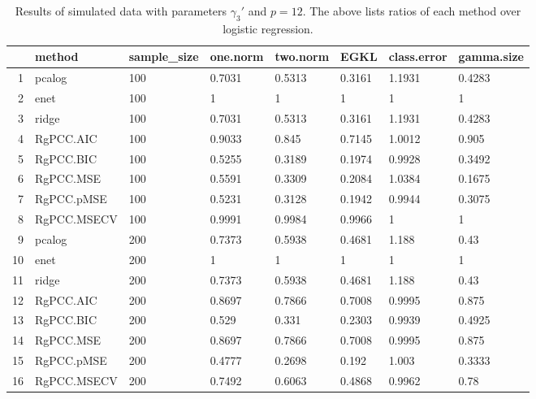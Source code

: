 \begin{table}[ht]
\centering
\begin{tabular}{rlllllll}
  \hline
 & method & sample\_size & one.norm & two.norm & EGKL & class.error & gamma.size \\ 
  \hline
1 & pcalog & 100 & 0.7031 & 0.5313 & 0.3161 & 1.1931 & 0.4283 \\ 
  2 & enet & 100 & 1 & 1 & 1 & 1 & 1 \\ 
  3 & ridge & 100 & 0.7031 & 0.5313 & 0.3161 & 1.1931 & 0.4283 \\ 
  4 & RgPCC.AIC & 100 & 0.9033 & 0.845 & 0.7145 & 1.0012 & 0.905 \\ 
  5 & RgPCC.BIC & 100 & 0.5255 & 0.3189 & 0.1974 & 0.9928 & 0.3492 \\ 
  6 & RgPCC.MSE & 100 & 0.5591 & 0.3309 & 0.2084 & 1.0384 & 0.1675 \\ 
  7 & RgPCC.pMSE & 100 & 0.5231 & 0.3128 & 0.1942 & 0.9944 & 0.3075 \\ 
  8 & RgPCC.MSECV & 100 & 0.9991 & 0.9984 & 0.9966 & 1 & 1 \\ 
  9 & pcalog & 200 & 0.7373 & 0.5938 & 0.4681 & 1.188 & 0.43 \\ 
  10 & enet & 200 & 1 & 1 & 1 & 1 & 1 \\ 
  11 & ridge & 200 & 0.7373 & 0.5938 & 0.4681 & 1.188 & 0.43 \\ 
  12 & RgPCC.AIC & 200 & 0.8697 & 0.7866 & 0.7008 & 0.9995 & 0.875 \\ 
  13 & RgPCC.BIC & 200 & 0.529 & 0.331 & 0.2303 & 0.9939 & 0.4925 \\ 
  14 & RgPCC.MSE & 200 & 0.8697 & 0.7866 & 0.7008 & 0.9995 & 0.875 \\ 
  15 & RgPCC.pMSE & 200 & 0.4777 & 0.2698 & 0.192 & 1.003 & 0.3333 \\ 
  16 & RgPCC.MSECV & 200 & 0.7492 & 0.6063 & 0.4868 & 0.9962 & 0.78 \\ 
   \hline
\end{tabular}
\caption{Results of simulated data with parameters $\gamma_3'$ and $p =12$. The above lists ratios of each method over logistic regression.} 
\label{fig-3'-nonlead-12-metrics-pratio}
\end{table}
